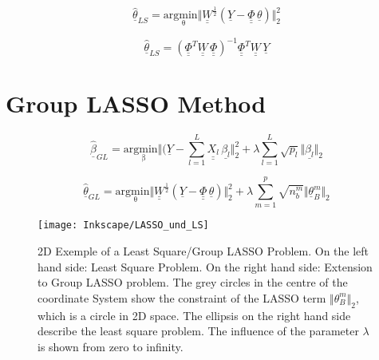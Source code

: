  \begin{equation}
			\hat{\underline{\theta}}_{LS} = \mathrm{arg \underset{\theta} min} \Vert \underline{\underline{W}}^{\frac{1}{2}}(\underline{Y}-\underline{\underline{\Phi}} \, \underline{\theta}) \Vert^2_2 	
	\label{eq:w_LS_intro}
\end{equation}

 \begin{equation}
	\hat{\underline{\theta}}_{LS} = (\underline{\underline{\Phi}}^T\underline{\underline{W}} \, \underline{\underline{\Phi}})^{-1}\underline{\underline{\Phi}}^T \underline{\underline{W}} \, \underline{Y}
	\label{eq:solution_w_LS}
\end{equation}


\section{Group LASSO Method}
\label{sec:Group_LASSO}



 \begin{equation}
	\hat{\underline{\beta}}_{GL} = \mathrm{arg \underset{\beta} min} \Vert  (\underline{Y} - \sum_{l=1}^L \underline{\underline{X_l}} \, \underline{\beta_l} \Vert^2_2 + \lambda \sum_{l=1}^L \sqrt{p_l} \Vert \underline{\beta_l} \Vert_2
	\label{eq:grouplasso_original}
\end{equation}



 \begin{equation}
	\hat{\underline{\theta}}_{GL} = \mathrm{arg \underset{\theta} min} \Vert \underline{\underline{W}}^{\frac{1}{2}} (\underline{Y}-\underline{\underline{\Phi}} \, \underline{\theta}) \Vert^2_2 + \lambda \sum_{m=1}^p \sqrt{n^m_b} \Vert \underline{\theta}^m_B \Vert_2
	\label{eq:grouplasso}
\end{equation}

\begin{figure}[!htb]
    \centering
    \texttt{[image: Inkscape/LASSO\_und\_LS]} %
    \caption[2D Example Least Square vs. Gruop LASSO]{2D Exemple of a Least Square/Group LASSO Problem. On the left hand side: Least Square Problem. On the right hand side: Extension to Group LASSO problem. The grey circles in the centre of the coordinate System show the constraint of the LASSO term $\Vert \theta^m_B \Vert_2$, which is a circle in 2D space. The ellipsis on the right hand side describe the least square problem. The influence of the parameter $\lambda$ is shown from zero to infinity.}
    \label{fig:2D_LASSO}
\end{figure}


